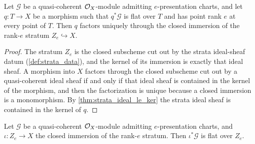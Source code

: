 \begin{theorem}
  \label{thm:stratum_lift_unique}
  \leanok
  Let \(\mathcal G\) be a quasi-coherent \(\mathcal{O}_X\)-module admitting
  \(e\)-presentation charts, and let \(q : T \to X\) be a morphism such that
  \(q^*\mathcal G\) is flat over \(T\) and has point rank \(e\) at every
  point of \(T\).  Then \(q\) factors uniquely through the closed immersion
  of the rank-\(e\) stratum \(Z_e \hookrightarrow X\).
\end{theorem}

\begin{proof}
  \leanok
  The stratum \(Z_e\) is the closed subscheme cut out by the strata
  ideal-sheaf datum (\cref{def:strata_data}), and the kernel of its
  immersion is exactly that ideal sheaf.  A morphism into \(X\) factors
  through the closed subscheme cut out by a quasi-coherent ideal sheaf if
  and only if that ideal sheaf is contained in the kernel of the morphism,
  and then the factorization is unique because a closed immersion is a
  monomorphism.  By \cref{thm:strata_ideal_le_ker} the strata ideal sheaf is
  contained in the kernel of \(q\).
\end{proof}

\begin{theorem}
  \label{thm:stratum_flattens}
  \leanok
  Let \(\mathcal G\) be a quasi-coherent \(\mathcal{O}_X\)-module admitting
  \(e\)-presentation charts, and \(\iota : Z_e \to X\) the closed immersion
  of the rank-\(e\) stratum.  Then \(\iota^*\mathcal G\) is flat over
  \(Z_e\).
\end{theorem}

